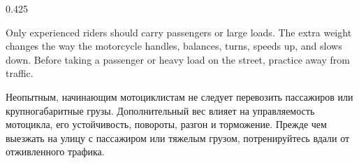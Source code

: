 

\begin{langblock}{0.425}
	\begin{eng}
	
	Only experienced riders should carry passengers or large loads. The extra weight changes the way the motorcycle handles, balances, turns, speeds up, and slows down. Before taking a passenger or heavy load on the street, practice away from traffic.
	\end{eng}
	\begin{rus}
		
		Неопытным, начинающим мотоциклистам не следует перевозить пассажиров или крупногабаритные грузы. Дополнительный вес влияет на управляемость мотоцикла, его устойчивость, повороты, разгон и торможение. Прежде чем выезжать на улицу с пассажиром или тяжелым грузом, потренируйтесь вдали от отживленного трафика.
\end{rus}
\end{langblock}





